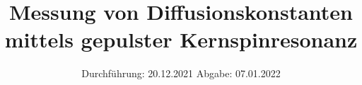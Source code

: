 
\setlength\parindent{0pt}
\subject{V49}
\title{Messung von Diffusionskonstanten mittels gepulster Kernspinresonanz}
\date{%
  Durchführung: 20.12.2021
  \hspace{3em}
  Abgabe: 07.01.2022 \\
}



\maketitle
\thispagestyle{empty}
\tableofcontents
\newpage







\newpage
\nocite{*}
\printbibliography
\appendix


